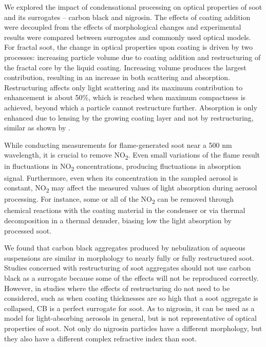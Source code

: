 
We explored the impact of condensational processing on optical properties of soot and its surrogates -- carbon black and nigrosin. The effects of coating addition were decoupled from the effects of morphological changes and experimental results were compared between surrogates and commonly used optical models.
For fractal soot, the change in optical properties upon coating is driven by two processes: increasing particle volume due to coating addition and restructuring of the fractal core by the liquid coating. Increasing volume produces the largest contribution, resulting in an increase in both scattering and absorption. Restructuring affects only light scattering and its maximum contribution to enhancement is about 50\%, which is reached when maximum compactness is achieved, beyond which a particle cannot restructure further. Absorption is only enhanced due to lensing by the growing coating layer and not by restructuring, similar as shown by \citet{RN67}. 

While conducting measurements for flame-generated soot near a 500 nm wavelength, it is crucial to remove NO\textsubscript{2}. Even small variations of the flame result in fluctuations in NO\textsubscript{2} concentrations, producing fluctuations in absorption signal. Furthermore, even when its concentration in the sampled aerosol is constant, NO\textsubscript{2} may affect the measured values of light absorption during aerosol processing. For instance, some or all of the NO\textsubscript{2} can be removed through chemical reactions with the coating material in the condenser or via thermal decomposition in a thermal denuder, biasing low the light absorption by processed soot.

We found that carbon black aggregates produced by nebulization of aqueous suspensions are similar in morphology to nearly fully or fully restructured soot. Studies concerned with restructuring of soot aggregates should not use carbon black as a surrogate because some of the effects will not be reproduced correctly. However, in studies where the effects of restructuring do not need to be considered, such as when coating thicknesses are so high that a soot aggregate is collapsed, CB is a perfect surrogate for soot. As to nigrosin, it can be used as a model for light-absorbing aerosols in general, but is not representative of optical properties of soot. Not only do nigrosin particles have a different morphology, but they also have a different complex refractive index than soot.

